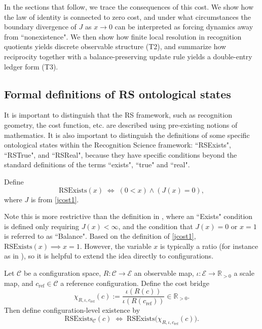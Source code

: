 \documentclass[11pt,a4paper]{article}
\newcommand{\RSExists}{\mathrm{RSExists}}
\newcommand{\Ccfg}{\mathcal{C}}
\newcommand{\Eset}{\mathcal{E}}
\newcommand{\Rpos}{\mathbb{R}_{>0}}
\begin{document}
In the sections that follow, we trace the consequences of this cost. We show how the law of identity is connected to zero cost, and under what circumstances the boundary divergence of $J$ as $x\rightarrow0$ can be interpreted as forcing dynamics away from ``nonexistence". We then show how finite local resolution in recognition quotients \cite{RecognitionGeometry} yields discrete observable structure (T2), and summarize how reciprocity together with a balance-preserving update rule yields a double-entry ledger form \cite{CoherentComparisonLedger} (T3).
\subsection{Formal definitions of RS ontological states}

It is important to distinguish that the RS framework, such as recognition geometry, the cost function, etc. are described using pre-existing notions of mathematics. 
It is also important to distinguish the definitions of some specific ontological states within the Recognition Science framework: ``RSExists", ``RSTrue", and ``RSReal", because they have specific conditions beyond the standard definitions of the terms ``exists", ``true" and ``real".

Define
\begin{equation}
  \RSExists(x)
  \;\Longleftrightarrow\;
  (0<x)\land (J(x)=0),\label{RSExistdef}
\end{equation}
where $J$ is from \ref{jcost1}.

Note this is more restrictive than the definition in \cite{CoherentComparisonLedger}, where an ``Exists" condition is defined only requiring $J(x)<\infty$, and the condition that $J(x)=0$ or $x=1$ is referred to as ``Balance". Based on the definition of \ref{jcost1}, $\mathrm{RSExists}(x)\implies x=1$. However, the variable $x$ is typically a ratio (for instance as in \cite{EntropyInterface}), so it is helpful to extend the idea directly to configurations.

Let \(\Ccfg\) be a configuration space, \(R:\Ccfg\to\Eset\) an observable map,
\(\iota:\Eset\to\Rpos\) a scale map, and \(c_{\mathrm{ref}}\in\Ccfg\) a reference configuration.
Define the cost bridge
\begin{equation}
  \chi_{R,\iota,c_{\mathrm{ref}}}(c)
  := \frac{\iota(R(c))}{\iota(R(c_{\mathrm{ref}}))}
  \in \Rpos.\label{chiratio}
\end{equation}
Then define configuration-level existence by
\begin{equation}
  \RSExists_{\Ccfg}(c)
  \;\Longleftrightarrow\;
  \RSExists\!\big(\chi_{R,\iota,c_{\mathrm{ref}}}(c)\big).\label{configexist}
\end{equation}
\end{document}
